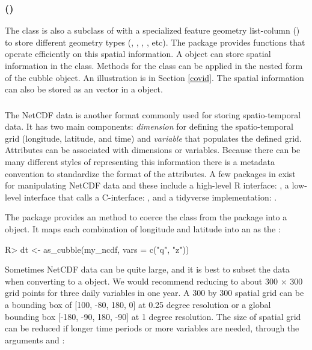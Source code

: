 \documentclass[
  shortnames]{jss}
\begin{document}
\subsubsection[]{ ()}

The  class is also a subclass of  with a specialized feature geometry list-column () to store different geometry types (, , , , etc). The package  provides functions that operate efficiently on this spatial information. A  object can store spatial information in the  class. Methods for the  class can be applied in the nested form of the cubble object. An illustration is in Section \ref{covid}. The spatial information can also be stored as an  vector in a  object.

\subsubsection[]{}\label{netcdf}

The NetCDF data is another format commonly used for storing spatio-temporal data. It has two main components: \emph{dimension} for defining the spatio-temporal grid (longitude, latitude, and time) and \emph{variable} that populates the defined grid. Attributes can be associated with dimensions or variables. Because there can be many different styles of representing this information there is a metadata convention \citep{hassell_data_2017} to standardize the format of the attributes. A few packages in  exist for manipulating NetCDF data and these include a high-level R interface:  \citep{ncdf4}, a low-level interface that calls a C-interface:  \citep{rnetcdf}, and a tidyverse implementation:  \citep{tidync}.

The  package provides an  method to coerce the  class from the  package into a  object. It maps each combination of longitude and latitude into an  as the :

\begin{CodeChunk}
\begin{CodeInput}
R> dt <- as_cubble(my_ncdf, vars = c("q", "z"))
\end{CodeInput}
\end{CodeChunk}

Sometimes NetCDF data can be quite large, and it is best to subset the data when converting to a  object. We would recommend reducing to about 300 \(\times\) 300 grid points for three daily variables in one year. A 300 by 300 spatial grid can be a bounding box of {[}100, -80, 180, 0{]} at 0.25 degree resolution or a global bounding box {[}-180, -90, 180, -90{]} at 1 degree resolution.
The size of spatial grid can be reduced if longer time periods or more variables are needed, through the arguments  and :
\end{document}
